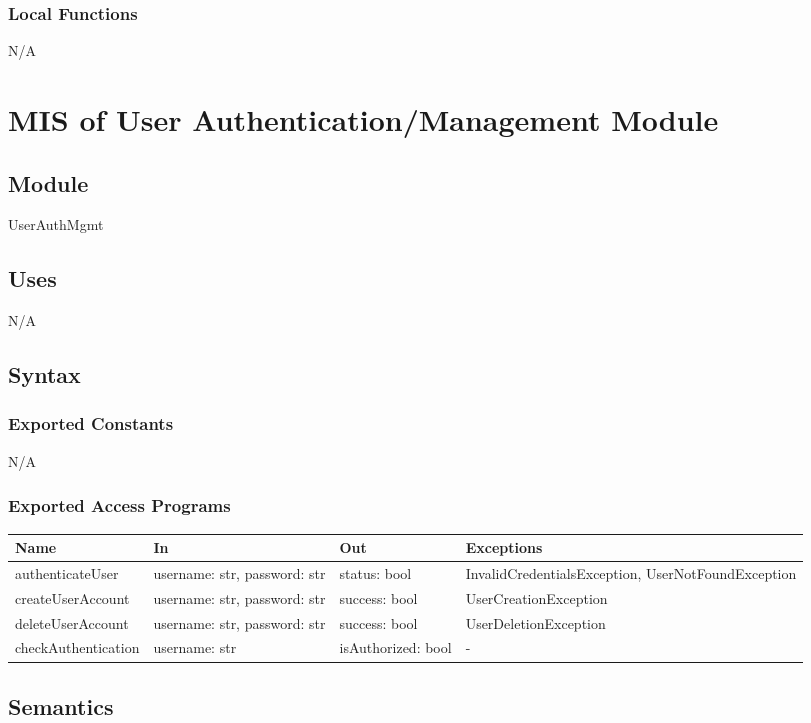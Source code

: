 \documentclass[12pt, titlepage]{article}
\begin{document}
\subsubsection{Local Functions}
N/A
\newpage

\section{MIS of User Authentication/Management Module} \label{mUserAuthMgmt}
\subsection{Module}
UserAuthMgmt

\subsection{Uses}
N/A

\subsection{Syntax}

\subsubsection{Exported Constants}
N/A
\subsubsection{Exported Access Programs}

\begin{center}
\begin{tabular}{p{4cm} p{5cm} p{3cm} p{5cm}}
\hline
\textbf{Name} & \textbf{In} & \textbf{Out} & \textbf{Exceptions} \\
\hline
authenticateUser & username: str, password: str & status: bool & InvalidCredentialsException, UserNotFoundException \\
createUserAccount & username: str, password: str & success: bool & UserCreationException \\
deleteUserAccount & username: str, password: str & success: bool & UserDeletionException \\
checkAuthentication & username: str & isAuthorized: bool & - \\
\hline
\end{tabular}
\end{center}

\subsection{Semantics}
\end{document}
